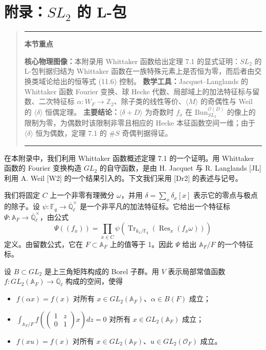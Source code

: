 \documentclass[11pt,a4paper]{article}
\newenvironment{keytakeaway}
  {\par\medskip\begin{quote}\small\noindent
   \rule{\linewidth}{0.6pt}\par\nopagebreak\smallskip\noindent
   \textbf{本节重点}\par\nobreak\smallskip\noindent\ignorespaces}
  {\par\smallskip\noindent\rule{\linewidth}{0.6pt}\end{quote}\medskip}
\newcommand{\Bun}{\mathrm{Bun}}
\newcommand{\Tr}{\operatorname{Tr}}
\begin{document}
\section{附录：\texorpdfstring{$SL_2$}{SL2} 的 L-包}

\begin{keytakeaway}
\textbf{核心物理图像：}本附录用 Whittaker 函数给出定理 7.1 的显式证明：$SL_2$ 的 L-包判据归结为 Whittaker 函数在一族特殊元素上是否恒为零，而后者由交换类域论给出的恒等式 (11.6) 控制。
\textbf{数学工具：}Jacquet--Langlands 的 Whittaker 函数 Fourier 变换、球 Hecke 代数、局部域上的加法特征标与留数、二次特征标 $\alpha: W_F\to\mathbb{Z}_2$、除子类的线性等价、$\langle M\rangle$ 的奇偶性与 Weil 的 $\langle\delta\rangle$ 恒偶定理。
\textbf{主要结论：}$\langle\delta+D\rangle$ 为奇数时 $f_{\tilde\sigma}$ 在 $\Bun^{\mathcal{O}(D)}_{SL_2}$ 的像上的限制为零，为偶数时该限制非零且相应的 Hecke 本征函数空间一维；由于 $\langle\delta\rangle$ 恒为偶数，定理 7.1 的 $\#S$ 奇偶判据得证。
\end{keytakeaway}

在本附录中，我们利用 Whittaker 函数概述定理 7.1 的一个证明。用 Whittaker 函数的 Fourier 变换构造 $GL_2$ 的自守函数，是由 H. Jacquet 与 R. Langlands [JL] 利用 A. Weil [W2] 的一个结果引入的。下文我们采用 [Dr2] 的表述与记号。

我们将固定 $C$ 上一个非零有理微分 $\omega$，并用 $\delta=\sum_x\delta_x[x]$ 表示它的零点与极点的除子。设 $\psi:\mathbb{F}_q\to\overline{\mathbb{Q}}_\ell^\times$ 是一个非平凡的加法特征标。它给出一个特征标 $\Psi:\mathbb{A}_F\to\overline{\mathbb{Q}}_\ell^\times$，由公式
\[
\Psi((f_x)) = \prod_{x\in C}\psi\left(\Tr_{k_x/\mathbb{F}_q}(\operatorname{Res}_x(f_x\omega))\right)
\]
定义。由留数公式，它在 $F\subset\mathbb{A}_F$ 上的值等于 1。因此 $\Psi$ 给出 $\mathbb{A}_F/F$ 的一个特征标。

设 $B\subset GL_2$ 是上三角矩阵构成的 Borel 子群。用 $V$ 表示局部常值函数 $f:GL_2(\mathbb{A}_F)\to\overline{\mathbb{Q}}_\ell$ 构成的空间，使得
\begin{itemize}[leftmargin=2.2em,itemsep=2pt,topsep=2pt]
\item[(1)] $f(\alpha x)=f(x)$ 对所有 $x\in GL_2(\mathbb{A}_F)$、$\alpha\in B(F)$ 成立；
\item[(2)] $\displaystyle\int_{\mathbb{A}_F/F}f\left(\begin{pmatrix}1&z\\ 0&1\end{pmatrix}x\right)dz=0$ 对所有 $x\in GL_2(\mathbb{A}_F)$ 成立；
\item[(3)] $f(xu)=f(x)$ 对所有 $x\in GL_2(\mathbb{A}_F)$、$u\in GL_2(\mathcal{O}_F)$ 成立。
\end{itemize}
\end{document}
